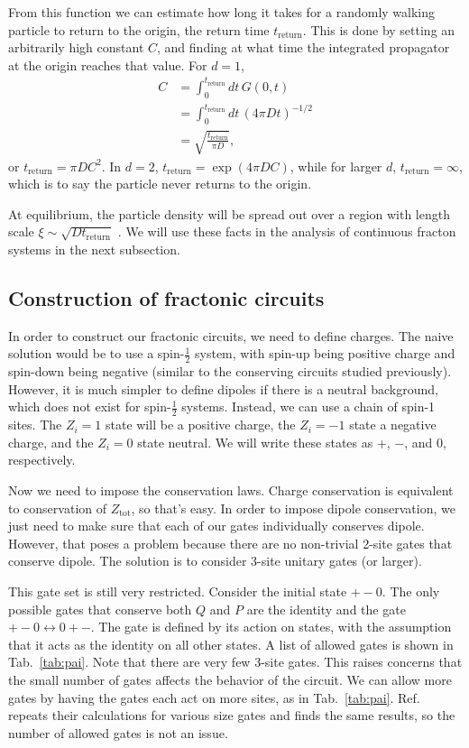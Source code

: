 \documentclass[a4paper,11pt]{article}
\renewcommand{\th}[1]{\frac{1}{#1}}
\newcommand{\ret}{\text{return}}
\newcommand{\note}[1]{{\color{red}{#1}}}
\begin{document}
From this function we can estimate how long it takes for a randomly walking particle to return to the origin, the return time $t_\ret$. This is done by setting an arbitrarily high constant $C$, and finding at what time the integrated propagator at the origin reaches that value. For $d=1$,
\begin{align}
C &= \int_{0}^{t_\ret}dt\,G(0,t)\\
&= \int_{0}^{t_\ret}dt\, (4\pi Dt)^{-1/2}\\
&= \sqrt{\frac{t_\ret}{\pi D}},
\end{align}
or $t_\ret=\pi D C^2$. In $d=2$, $t_\ret=\exp(4\pi DC)$, while for larger $d$, $t_\ret=\infty$, which is to say the particle never returns to the origin. 

At equilibrium, the particle density will be spread out over a region with length scale $\xi\sim\sqrt{Dt_\ret}$ \note{(Why?)}. We will use these facts in the analysis of continuous fracton systems in the next subsection.

\subsection{Construction of fractonic circuits} \label{sub:construct}

In order to construct our fractonic circuits, we need to define charges. The naive solution would be to use a spin-$\th{2}$ system, with spin-up being positive charge and spin-down being negative (similar to the conserving circuits studied previously). However, it is much simpler to define dipoles if there is a neutral background, which does not exist for spin-$\th{2}$ systems. Instead, we can use a chain of spin-1 sites. The $Z_i=1$ state will be a positive charge, the $Z_i=-1$ state a negative charge, and the $Z_i=0$ state neutral. We will write these states as +, $-$, and 0, respectively.

Now we need to impose the conservation laws. Charge conservation is equivalent to conservation of $Z_\text{tot}$, so that's easy. In order to impose dipole conservation, we just need to make sure that each of our gates individually conserves dipole. However, that poses a problem because there are no non-trivial 2-site gates that conserve dipole. The solution is to consider 3-site unitary gates (or larger).

This gate set is still very restricted. Consider the initial state $+-0$. The only possible gates that conserve both $Q$ and $P$ are the identity and the gate $+-0\leftrightarrow 0+-$. The gate is defined by its action on states, with the assumption that it acts as the identity on all other states. A list of allowed gates is shown in Tab.~\ref{tab:pai}. Note that there are very few 3-site gates. This raises concerns that the small number of gates affects the behavior of the circuit. We can allow more gates by having the gates each act on more sites, as in Tab.~\ref{tab:pai}. Ref.~\cite{PaiFracton} repeats their calculations for various size gates and finds the same results, so the number of allowed gates is not an issue.

\end{document}
